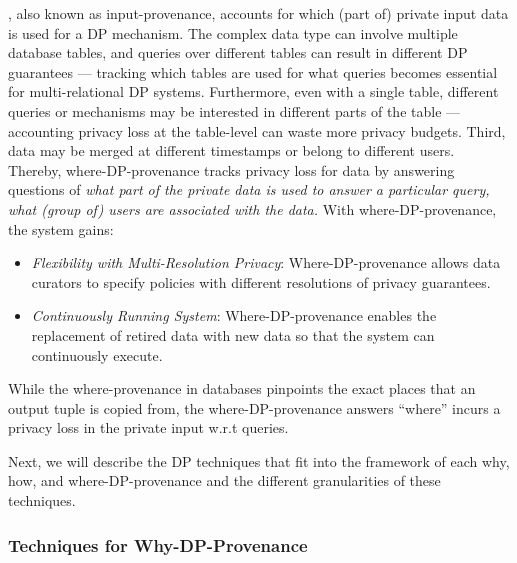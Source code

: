 , also known as input-provenance, accounts for which (part of) private input data is used for a DP mechanism.
The complex data type can involve multiple database tables, and queries over different tables can result in different DP guarantees --- tracking which tables are used for what queries becomes essential for multi-relational DP systems.
Furthermore, even with a single table, different queries or mechanisms may be interested in different parts of the table --- accounting privacy loss at the table-level can waste more privacy budgets.
Third, data may be merged at different timestamps or belong to different users.
Thereby, where-DP-provenance tracks privacy loss for data by answering questions of \emph{what part of the private data is used to answer a particular query, what (group of) users are associated with the data.}
With where-DP-provenance, the system gains:
\begin{itemize}
    \item \emph{Flexibility with Multi-Resolution Privacy}: Where-DP-provenance allows data curators to specify policies with different resolutions of privacy guarantees.
    \item \emph{Continuously Running System}: Where-DP-provenance enables the replacement of retired data with new data so that the system can continuously execute.
\end{itemize}
While the where-provenance in databases pinpoints the exact places that an output tuple is copied from, the where-DP-provenance answers ``where'' incurs a privacy loss in the private input w.r.t queries.





Next, we will describe the DP techniques that fit into the framework of each why, how, and where-DP-provenance and the different granularities of these techniques.


\subsubsection{Techniques for Why-DP-Provenance}


